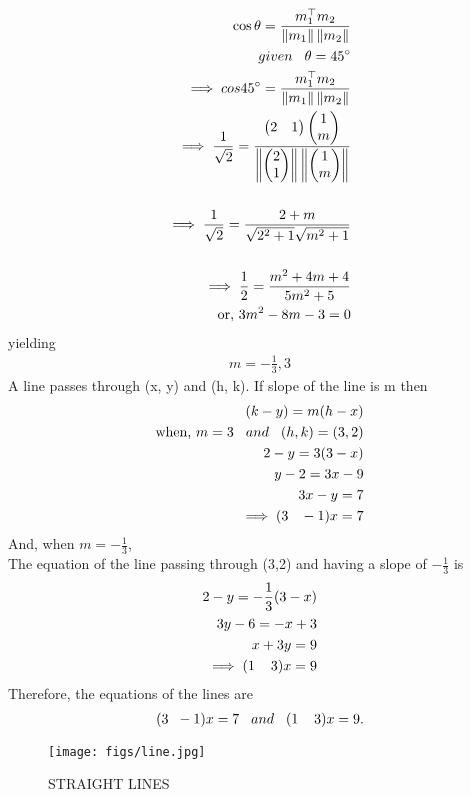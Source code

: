 \documentclass[10pt,a4paper]{report}
\newcommand{\myvec}[1]{\ensuremath{\begin{pmatrix}#1\end{pmatrix}}}
\providecommand{\norm}[1]{\left\lVert#1\right\rVert}
\begin{document}
\begin{align}
\cos \theta = \frac{m_1^\top m_2}{\norm{m_1}\norm{m_2}}\\
given\hspace{0.3cm}  \theta = 45^\circ\\
\implies cos45^\circ =  \frac{m_1^\top m_2}{\norm{m_1}\norm{m_2}}\\
\implies \frac{1}{\sqrt{2}} = \frac{\myvec{2 & 1} \myvec{1\\m}}{\norm{\myvec{2\\1}}\norm{\myvec{1\\m}}}\\
\\
\implies \frac{1}{\sqrt{2}}=\frac{2+m}{\sqrt{2^2 + 1}\sqrt{m^2 + 1}}\\
\\
\implies \frac{1}{2}=\frac{m^2 + 4m +4}{5m^2 +5}\\
\text{or, } 3m^2 - 8m -3 = 0
\end{align}
yielding
\begin{align}
m= - \frac{1}{3}, 
 3
\end{align} 
 A line passes through (x, y) and (h, k). If slope of the line is m then
\begin{align}
(k-y) = m(h-x)\\
\text{when, } m=3 \hspace{0.3cm} and \hspace{0.3cm} (h,k)=(3,2)\\
    2-y=3(3-x)\\
     y-2=3x-9\\
    3x-y=7\\
    \implies (3 \hspace{0.3cm} -1)x=7
\end{align}
And, when $m=-\frac{1}{3}$,\\
The equation of the line passing through (3,2) and having a slope of $-\frac{1}{3}$ is
\begin{align}
    2-y=-\frac{1}{3}(3-x)\\
    3y-6=-x+3\\
    x+3y=9\\
    \implies (1 \hspace{0.4cm} 3)x=9
\end{align}
Therefore, the equations of the lines are 
\begin{align}
 (3 \hspace{0.2cm} -1)x=7    \hspace{0.3cm}and\hspace{0.3cm} (1 \hspace{0.4cm} 3)x=9 .
\end{align}
\begin{figure}[H]
\centering
\texttt{[image: figs/line.jpg]}
\caption{STRAIGHT LINES}
\label{fig:line.jpg}
\end{figure}
\end{document}
